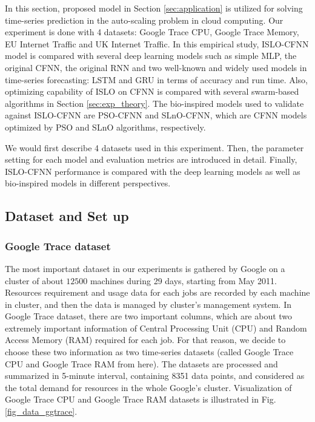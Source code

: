 \documentclass[../main.tex]{subfiles}
\begin{document}
	In this section, proposed model in Section \ref{sec:application} is utilized for solving time-series prediction in the auto-scaling problem in cloud computing. Our experiment is done with 4 datasets: Google Trace CPU, Google Trace Memory, EU Internet Traffic and UK Internet Traffic. In this empirical study, ISLO-CFNN model is compared with several deep learning models such as simple MLP, the original CFNN, the original RNN and two well-known and widely used models in time-series forecasting: LSTM and GRU in terms of accuracy and run time. Also, optimizing capability of ISLO on CFNN is compared with several swarm-based algorithms in Section \ref{sec:exp_theory}. The bio-inspired models used to validate against ISLO-CFNN are PSO-CFNN and SLnO-CFNN, which are CFNN models optimized by PSO and SLnO algorithms, respectively.
	
	We would first describe 4 datasets used in this experiment. Then, the parameter setting for each model and evaluation metrics are introduced in detail. Finally, ISLO-CFNN performance is compared with the deep learning models as well as bio-inspired models in different perspectives.

\subsection{Dataset and Set up}
\label{exp:data}

\subsubsection{Google Trace dataset}
	The most important dataset in our experiments is gathered by Google on a cluster of about $12500$ machines \cite{reiss2011google} during 29 days, starting from May 2011. Resources requirement and usage data for each jobs are recorded by each machine in cluster, and then the data is managed by cluster's management system. In Google Trace dataset, there are two important columns, which are about two extremely important information of Central Processing Unit (CPU) and Random Access Memory (RAM) required for each job. For that reason, we decide to choose these two information as two time-series datasets (called Google Trace CPU and Google Trace RAM from here). The datasets are processed and summarized in 5-minute interval, containing 8351 data points, and considered as the total demand for resources in the whole Google's cluster. Visualization of Google Trace CPU and Google Trace RAM datasets is illustrated in Fig. \ref{fig_data_ggtrace}. 
	
\end{document}
